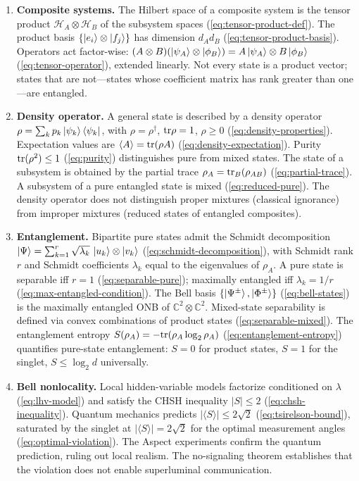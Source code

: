 \begin{enumerate}
\item[(E1)] \textbf{Composite systems.} The Hilbert space of a composite system is the tensor product $\mathcal{H}_A \otimes \mathcal{H}_B$ of the subsystem spaces (\eqref{eq:tensor-product-def}). The product basis $\{\ket{e_i} \otimes \ket{f_j}\}$ has dimension $d_A d_B$ (\eqref{eq:tensor-product-basis}). Operators act factor-wise: $(A \otimes B)(\ket{\psi_A} \otimes \ket{\phi_B}) = A\ket{\psi_A} \otimes B\ket{\phi_B}$ (\eqref{eq:tensor-operator}), extended linearly. Not every state is a product vector; states that are not---states whose coefficient matrix has rank greater than one---are entangled.

\item[(E2)] \textbf{Density operator.} A general state is described by a density operator $\rho = \sum_k p_k \ket{\psi_k}\bra{\psi_k}$, with $\rho = \rho^\dagger$, $\mathrm{tr}\rho = 1$, $\rho \ge 0$ (\eqref{eq:density-properties}). Expectation values are $\langle A \rangle = \mathrm{tr}(\rho A)$ (\eqref{eq:density-expectation}). Purity $\mathrm{tr}(\rho^2) \le 1$ (\eqref{eq:purity}) distinguishes pure from mixed states. The state of a subsystem is obtained by the partial trace $\rho_A = \mathrm{tr}_B(\rho_{AB})$ (\eqref{eq:partial-trace}). A subsystem of a pure entangled state is mixed (\eqref{eq:reduced-pure}). The density operator does not distinguish proper mixtures (classical ignorance) from improper mixtures (reduced states of entangled composites).

\item[(E3)] \textbf{Entanglement.} Bipartite pure states admit the Schmidt decomposition $\ket{\Psi} = \sum_{k=1}^{r} \sqrt{\lambda_k}\,\ket{u_k} \otimes \ket{v_k}$ (\eqref{eq:schmidt-decomposition}), with Schmidt rank $r$ and Schmidt coefficients $\lambda_k$ equal to the eigenvalues of $\rho_A$. A pure state is separable iff $r = 1$ (\eqref{eq:separable-pure}); maximally entangled iff $\lambda_k = 1/r$ (\eqref{eq:max-entangled-condition}). The Bell basis $\{\ket{\Psi^\pm}, \ket{\Phi^\pm}\}$ (\eqref{eq:bell-states}) is the maximally entangled ONB of $\mathbb{C}^2 \otimes \mathbb{C}^2$. Mixed-state separability is defined via convex combinations of product states (\eqref{eq:separable-mixed}). The entanglement entropy $S(\rho_A) = -\mathrm{tr}(\rho_A\log_2\rho_A)$ (\eqref{eq:entanglement-entropy}) quantifies pure-state entanglement: $S = 0$ for product states, $S = 1$ for the singlet, $S \le \log_2 d$ universally.

\item[(E4)] \textbf{Bell nonlocality.} Local hidden-variable models factorize conditioned on $\lambda$ (\eqref{eq:lhv-model}) and satisfy the CHSH inequality $\lvert S\rvert \le 2$ (\eqref{eq:chsh-inequality}). Quantum mechanics predicts $\lvert\langle S\rangle\rvert \le 2\sqrt{2}$ (\eqref{eq:tsirelson-bound}), saturated by the singlet at $\lvert\langle S\rangle\rvert = 2\sqrt{2}$ for the optimal measurement angles (\eqref{eq:optimal-violation}). The Aspect experiments confirm the quantum prediction, ruling out local realism. The no-signaling theorem establishes that the violation does not enable superluminal communication.
\end{enumerate}

